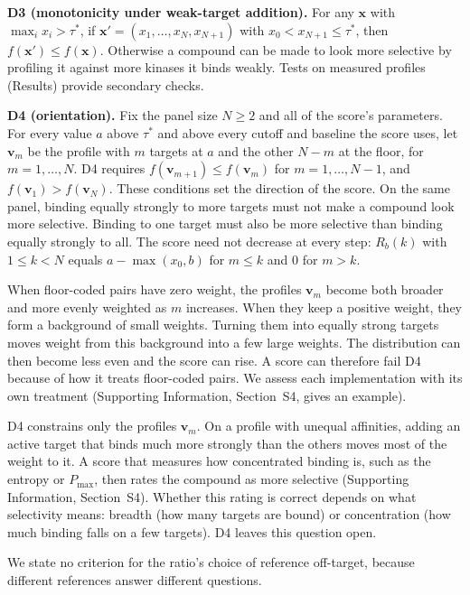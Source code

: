 \textbf{D3 (monotonicity under weak-target addition).} For any $\mathbf{x}$ with
$\max_i x_i > \tau^*$, if $\mathbf{x}' = (x_1, \ldots, x_N, x_{N+1})$ with
$x_0 < x_{N+1} \leq \tau^*$, then $f(\mathbf{x}') \leq f(\mathbf{x})$. Otherwise a
compound can be made to look more selective by profiling it against more
kinases it binds weakly. Tests on measured profiles (Results) provide
secondary checks.

\textbf{D4 (orientation).} Fix the panel size $N \geq 2$ and all of the
score's parameters. For every value $a$ above $\tau^*$ and above every cutoff
and baseline the score uses, let $\mathbf{v}_m$ be the profile with $m$ targets
at $a$ and the other $N - m$ at the floor, for $m = 1, \ldots, N$. D4 requires
$f(\mathbf{v}_{m+1}) \leq f(\mathbf{v}_m)$ for $m = 1, \ldots, N - 1$, and
$f(\mathbf{v}_1) > f(\mathbf{v}_N)$. These conditions set the direction of the
score. On the same panel, binding equally strongly to more targets must not
make a compound look more selective. Binding to one target must also be more
selective than binding equally strongly to all. The score need not decrease
at every step: $R_b(k)$ with $1 \leq k < N$ equals
$a - \max(x_0, b)$ for $m \leq k$ and $0$ for $m > k$.

When floor-coded pairs have zero weight, the profiles $\mathbf{v}_m$ become
both broader and more evenly weighted as $m$ increases. When they keep a
positive weight, they form a background of small weights. Turning them into
equally strong targets moves weight from this background into a few large
weights. The distribution can then become less even and the score can rise.
A score can therefore fail D4 because of how it treats floor-coded pairs.
We assess each implementation with its own treatment (Supporting Information,
Section~S4, gives an example).

D4 constrains only the profiles $\mathbf{v}_m$. On a profile with unequal
affinities, adding an active target that binds much more strongly than the
others moves most of the weight to it. A score that measures how concentrated
binding is, such as the entropy or $P_{\max}$, then rates the compound as more
selective (Supporting Information, Section~S4). Whether this rating is correct
depends on what selectivity means: breadth (how many targets are bound) or
concentration (how much binding falls on a few targets). D4 leaves this
question open.

We state no criterion for the ratio's choice of reference off-target, because
different references answer different questions.

